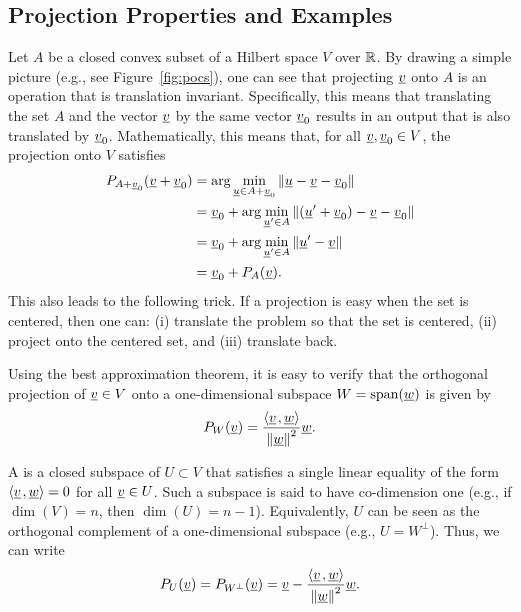 \subsection{Projection Properties and Examples}

Let $A$ be a closed convex subset of a Hilbert space $V$ over $\mathbb{R}$.
By drawing a simple picture (e.g., see Figure~\ref{fig:pocs}), one can see that projecting $\underline{v}$ onto $A$ is an operation that is translation invariant.
Specifically, this means that translating the set $A$ and the vector $\underline v$ by the same vector $\underline v_{0}$ results in an output that is also translated by $\underline v_{0}$.
Mathematically, this means that, for all $\underline v,\underline v_{0}\in V$, the projection onto $V$ satisfies
\begin{align*}
P_{A+\underline v_{0}}(\underline v+\underline v_{0}) & =\arg\min_{\underline u\in A+\underline v_{0}}\left\Vert \underline u-\underline v-\underline v_{0}\right\Vert \nonumber \\
 & =\underline v_{0}+\arg\min_{\underline u'\in A}\left\Vert (\underline u'+\underline v_{0})-\underline v-\underline v_{0}\right\Vert \nonumber \\
 & =\underline v_{0}+\arg\min_{\underline u'\in A}\left\Vert \underline u'-\underline v\right\Vert \nonumber \\
 & =\underline v_{0}+P_{A}(\underline v).\label{eq:proj_trans}
\end{align*}
This also leads to the following trick. If a projection is easy when the set is centered, then one can: (i) translate the problem so that the set is centered, (ii) project onto the centered set, and (iii) translate back. 

Using the best approximation theorem, it is easy to verify that the orthogonal projection of $\underline v\in V$ onto a one-dimensional subspace $W=\text{span}(\underline w)$ is given by
\[
P_{W}(\underline v)=\frac{{\left\langle  \underline v \mskip2mu , \underline w \right\rangle} }{\left\Vert \underline w\right\Vert ^{2}}\underline w.
\]

A  is a closed subspace of $U \subset V$ that satisfies a single linear equality of the form ${\left\langle  \underline v \mskip2mu , \underline w \right\rangle} =0$ for all $\underline{v}\in U$.
Such a subspace is said to have co-dimension one (e.g., if $\dim(V)=n$, then $\dim(U) = n-1$). Equivalently, $U$ can be seen as the orthogonal complement of a one-dimensional subspace (e.g., $U=W^{\perp}$).
Thus, we can write
\[
P_{U}(\underline v)=P_{W^{\perp}}(\underline v)=\underline v-\frac{{\left\langle  \underline v \mskip2mu , \underline w \right\rangle} }{\left\Vert \underline w\right\Vert ^{2}}\underline w.
\]

